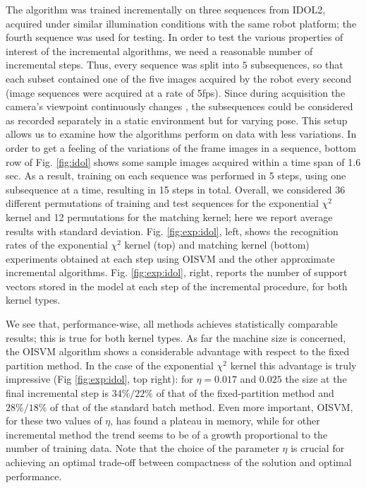The algorithm was trained incrementally on three sequences from IDOL2,
acquired under similar illumination conditions with the same robot
platform; the fourth sequence was used for testing. In order to test
the various properties of interest of the incremental algorithms, we
need a reasonable number of incremental steps.  Thus, every sequence
was split into $5$ subsequences, so that each subset contained one
of the five images acquired by the robot every second (image sequences
were acquired at a rate of 5fps). Since during acquisition the
camera's viewpoint continuously changes \cite{luo:icra07}, the
subsequences could be considered as recorded separately in a static
environment but for varying pose.  This setup allows us to examine how
the algorithms perform on data with less variations. In order to get a
feeling of the variations of the frame images in a sequence, bottom
row of Fig. \ref{fig:idol} shows some sample images acquired within a
time span of 1.6 sec. As a result, training
on each sequence was performed in 5 steps, using one subsequence at a
time, resulting in 15 steps in total. Overall, we considered 36
different permutations of training and test sequences for the
exponential $\chi^2$ kernel and 12 permutations for the matching
kernel; here we report average results with standard
deviation. Fig. \ref{fig:exp:idol}, left, shows the recognition rates
of the exponential $\chi^2$ kernel (top) and matching kernel (bottom)
experiments obtained at each step using OISVM and the other
approximate incremental algorithms. Fig. \ref{fig:exp:idol}, right,
reports the number of support vectors stored in the model at each step
of the incremental procedure, for both kernel types.

We see that, performance-wise, all methods achieves statistically
comparable results; this is true for both kernel types. As far the
machine size is concerned, the OISVM algorithm shows a considerable
advantage with respect to the fixed partition method. In the case of the exponential
$\chi^{2}$ kernel this advantage is truly impressive (Fig
\ref{fig:exp:idol}, top right): for $\eta=0.017$ and $0.025$ the
size at the final incremental step is $34\%/22\%$ of that of the
fixed-partition method and $28\%/18\%$ of that of the
standard batch method. Even more important, OISVM, for these two
values of $\eta$, has found a plateau in memory, while for other incremental
method the trend seems to be of a growth proportional to the
number of training data. Note
that the choice of the parameter $\eta$ is crucial for achieving an
optimal trade-off between compactness of the solution and optimal
performance.

